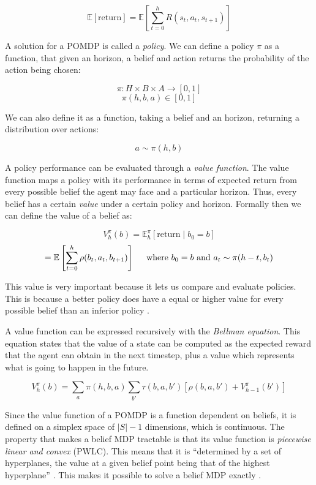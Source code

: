 \[ \mathbb{E}[\text{return}] = \mathbb{E} \left [ \sum_{t=0}^{h} R(s_t, a_t, s_{t+1}) \right ] \]

A solution for a POMDP is called a \textit{policy}. We can define a policy $\pi$ as a function, that
given an horizon, a belief and action returns the probability of the action being chosen:

\[ \pi : H \times B \times A \rightarrow [0,1] \]
\[ \pi(h, b, a) \in [0,1] \]

We can also define it as a function, taking a belief and an horizon, returning a distribution over
actions:

\[ a \sim \pi(h, b) \]

A policy performance can be evaluated through a \textit{value function}. The value function maps a
policy with its performance in terms of expected return from every possible belief the agent may
face and a particular horizon. Thus, every belief has a certain \textit{value} under a certain
policy and horizon. Formally then we can define the value of a belief as:

\[ V^\pi_{h}(b) = \mathbb{E}^\pi_h \left [\text{return} \mid b_0 = b \right ] \]
\[ = \mathbb{E} \left [\sum_{t=0}^{h} \rho(b_{t}, a_t, b_{t+1}) \right ]
    \hspace{0.5cm}\text{where }b_0 = b \text{ and }a_t \sim \pi(h-t, b_t) \]

This value is very important because it lets us compare and evaluate policies. This is because a
better policy does have a equal or higher value for every possible belief than an inferior policy
\cite{cit:suttonbarto}.

A value function can be expressed recursively with the \textit{Bellman equation}. This equation
states that the value of a state can be computed as the expected reward that the agent can obtain in
the next timestep, plus a value which represents what is going to happen in the future.

\[ V^{\pi}_{h}(b) = \sum_a \pi(h, b, a) \sum_{b'} \tau(b, a, b') \left [ \rho(b, a, b') +
V^{\pi}_{h-1}(b') \right ] \]

Since the value function of a POMDP is a function dependent on beliefs, it is defined on a simplex
space of $|S|-1$ dimensions, which is continuous. The property that makes a belief MDP tractable is
that its value function is \textit{piecewise linear and convex} (PWLC). This means that it is
``determined by a set of hyperplanes, the value at a given belief point being that of the highest
hyperplane'' \cite{cit:rpomdp}. This makes it possible to solve a belief MDP exactly
\cite{cit:pomdp}.

